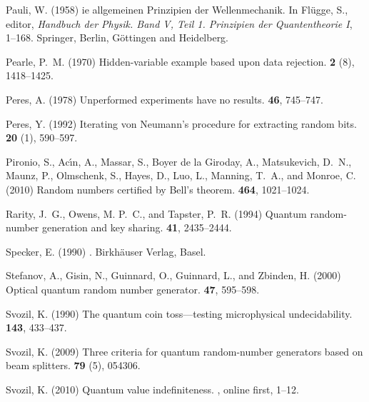 \documentclass{mscs}
\begin{document}
\begin{thebibliography}{}
Pauli, W. (1958)
ie allgemeinen {P}rinzipien der {W}ellenmechanik.
\newblock In Fl{\"{u}}gge, S., editor, {\em {H}andbuch der {P}hysik. {B}and
  {V}, {T}eil 1. {P}rinzipien der {Q}uantentheorie {I}}, 1--168.
  Springer, Berlin, G{\"{o}}ttingen and Heidelberg.

Pearle, P.~M. (1970)
\newblock Hidden-variable example based upon data rejection.
 {\bf 2} (8), 1418--1425.

Peres, A. (1978)
\newblock Unperformed experiments have no results.
 {\bf 46}, 745--747.

Peres, Y. (1992)
\newblock Iterating von {N}eumann's procedure for extracting random bits.
 {\bf 20} (1), 590--597.

Pironio, S., Ac{\'\i}n, A., Massar, S., {Boyer de la Giroday}, A., Matsukevich,
  D.~N., Maunz, P., Olmschenk, S., Hayes, D., Luo, L., Manning, T.~A., and
  Monroe, C. (2010)
\newblock Random numbers certified by {B}ell's theorem.
 {\bf 464}, 1021--1024.

Rarity, J.~G., Owens, M. P.~C., and Tapster, P.~R. (1994)
\newblock Quantum random-number generation and key sharing.
 {\bf 41}, 2435--2444.

Specker, E. (1990)
.
\newblock Birkh{\"{a}}user Verlag, Basel.

Stefanov, A., Gisin, N., Guinnard, O., Guinnard, L., and Zbinden, H. (2000)
\newblock Optical quantum random number generator.
 {\bf 47}, 595--598.

Svozil, K. (1990)
\newblock The quantum coin toss---testing microphysical undecidability.
 {\bf 143}, 433--437.

Svozil, K. (2009)
\newblock Three criteria for quantum random-number generators based on beam
  splitters.
 {\bf 79} (5), 054306.

Svozil, K. (2010)
\newblock Quantum value indefiniteness.
, online first, 1--12.


\end{thebibliography}
\end{document}
